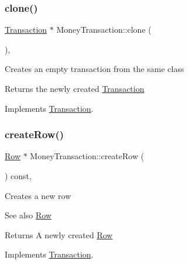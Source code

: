 \subsubsection{\texorpdfstring{clone()}{clone()}}
{\footnotesize\ttfamily \mbox{\hyperlink{classTransaction}{Transaction}} $\ast$ Money\+Transaction\+::clone (\begin{DoxyParamCaption}{ }\end{DoxyParamCaption})\hspace{0.3cm}{\ttfamily [override]}, {\ttfamily [virtual]}}

Creates an empty transaction from the same class

\begin{DoxyReturn}{Returns}
the newly created \mbox{\hyperlink{classTransaction}{Transaction}} 
\end{DoxyReturn}


Implements \mbox{\hyperlink{classTransaction_ad6ee9c5e4067b2f5c950c6aad131b3e4}{Transaction}}.

\mbox{\label{classMoneyTransaction_a53b636ba053baae7705976efce629d21}} 
\subsubsection{\texorpdfstring{create\+Row()}{createRow()}}
{\footnotesize\ttfamily \mbox{\hyperlink{classRow}{Row}} $\ast$ Money\+Transaction\+::create\+Row (\begin{DoxyParamCaption}{ }\end{DoxyParamCaption}) const\hspace{0.3cm}{\ttfamily [override]}, {\ttfamily [virtual]}}

Creates a new row \begin{DoxySeeAlso}{See also}
\mbox{\hyperlink{classRow}{Row}}
\end{DoxySeeAlso}
\begin{DoxyReturn}{Returns}
A newly created \mbox{\hyperlink{classRow}{Row}} 
\end{DoxyReturn}


Implements \mbox{\hyperlink{classTransaction_aa80b621537fe480dcb4444bba703abe5}{Transaction}}.

\mbox{\label{classMoneyTransaction_a23b793077f5c5e3157155df148e0d5e1}} 
